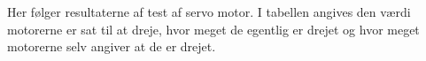\label{appendix:motor_test}
Her følger resultaterne af test af \legos servo motor.
I tabellen angives den værdi motorerne er sat til at dreje, hvor meget de egentlig er drejet og hvor meget motorerne selv angiver at de er drejet.

